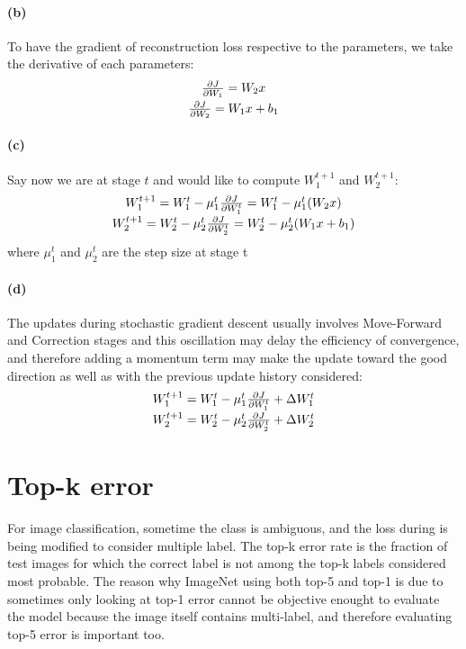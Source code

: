 \documentclass{article}
\begin{document}
\paragraph{(b)} To have the gradient of reconstruction loss respective to the parameters, we take the derivative of each parameters:
\begin{equation}
\begin{matrix}
{\partial J \over \partial W_1} = W_2x \\[0.4em]
{\partial J \over \partial W_2} = W_1x + b_1
\end{matrix}
\end{equation}

\paragraph{(c)} Say now we are at stage $t$ and would like to compute $W_1^{t+1}$ and $W_2^{t+1}$:
\begin{equation}
\begin{matrix}
W_1^{t+1} = W_1^t - \mu_1^t {\partial J \over \partial W_1^t} = W_1^t - \mu_1^t(W_2x) \\[0.4em]
W_2^{t+1} = W_2^t - \mu_2^t {\partial J \over \partial W_2^t} = W_2^t - \mu_2^t(W_1x+b_1)
\end{matrix}
\end{equation}
where $\mu_1^t$ and $\mu_2^t$ are the step size at stage t

\paragraph{(d)} The updates during stochastic gradient descent usually involves Move-Forward and Correction stages and this oscillation may delay the efficiency of convergence, and therefore adding a momentum term may make the update toward the good direction as well as with the previous update history considered:
\begin{equation}
\begin{matrix}
W_1^{t+1} = W_1^t - \mu_1^t {\partial J \over \partial W_1^t} + \Delta W_1^t \\[0.4em]
W_2^{t+1} = W_2^t - \mu_2^t {\partial J \over \partial W_2^t} + \Delta W_2^t
\end{matrix}
\end{equation}

\section{Top-k error}
For image classification, sometime the class is ambiguous, and the loss during is being modified to consider multiple label. The top-k error rate is the fraction of test images for which the correct label is not among the top-k labels considered most probable. The reason why ImageNet using both top-5 and top-1 is due to sometimes only looking at top-1 error cannot be objective enought to evaluate the model because the image itself contains multi-label, and therefore evaluating top-5 error is important too.
\end{document}
